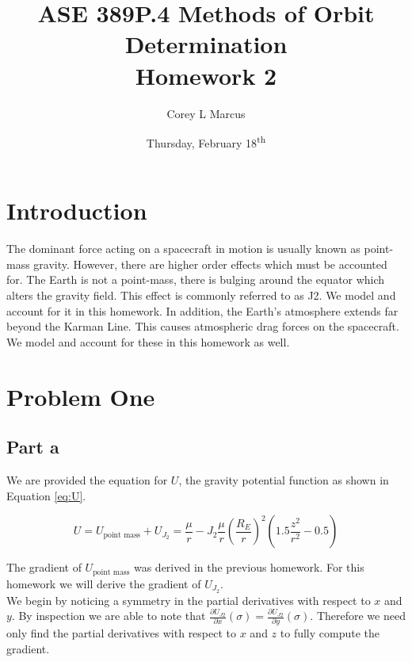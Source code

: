 \documentclass[11pt]{article}
\title{ASE 389P.4 Methods of Orbit Determination \\ Homework 2}
\author{Corey L Marcus} \date{Thursday, February 18\textsuperscript{th}}
\begin{document}
\onehalfspace
\maketitle


\section{Introduction}

The dominant force acting on a spacecraft in motion is usually known as point-mass gravity. However, there are higher order effects which must be accounted for. The Earth is not a point-mass, there is bulging around the equator which alters the gravity field. This effect is commonly referred to as J2. We model and account for it in this homework. In addition, the Earth's atmosphere extends far beyond the Karman Line. This causes atmospheric drag forces on the spacecraft. We model and account for these in this homework as well. \\

\section{Problem One}

\subsection{Part a}

We are provided the equation for $U$, the gravity potential function as shown in Equation \eqref{eq:U}.

\begin{equation}
	\label{eq:U}
	U = U_{\text{point mass}} + U_{J_2} = \frac{\mu}{r} - J_2 \frac{\mu}{r} \left( \frac{R_E}{r} \right)^2 \left( 1.5 \frac{z^2}{r^2} - 0.5\right)
\end{equation}

The gradient of $U_{\text{point mass}}$ was derived in the previous homework. For this homework we will derive the gradient of $U_{J_2}$. \\

We begin by noticing a symmetry in the partial derivatives with respect to $x$ and $y$. By inspection we are able to note that $\frac{\partial U_{J2}}{\partial x} (\sigma) = \frac{\partial U_{J2}}{\partial y} (\sigma)$. Therefore we need only find the partial derivatives with respect to $x$ and $z$ to fully compute the gradient. \\
\end{document}
